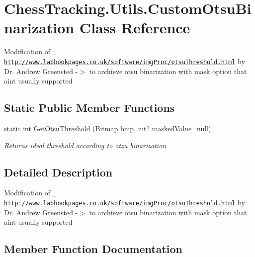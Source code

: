 \hypertarget{class_chess_tracking_1_1_utils_1_1_custom_otsu_binarization}{}\section{Chess\+Tracking.\+Utils.\+Custom\+Otsu\+Binarization Class Reference}
\label{class_chess_tracking_1_1_utils_1_1_custom_otsu_binarization}


Modification of \href{http://www.labbookpages.co.uk/software/imgProc/otsuThreshold.html}{\texttt{ http\+://www.\+labbookpages.\+co.\+uk/software/img\+Proc/otsu\+Threshold.\+html}} by Dr. Andrew Greensted -\/$>$ to archieve otsu binarization with mask option that ain\textquotesingle{}t usually supported  


\subsection*{Static Public Member Functions}
\begin{DoxyCompactItemize}
\item 
static int \mbox{\hyperlink{class_chess_tracking_1_1_utils_1_1_custom_otsu_binarization_a5d3e1412d590a1845413b0f2ae5f794c}{Get\+Otsu\+Threshold}} (Bitmap bmp, int? masked\+Value=null)
\begin{DoxyCompactList}\small\item\em Returns ideal threshold according to otzu binarization \end{DoxyCompactList}\end{DoxyCompactItemize}


\subsection{Detailed Description}
Modification of \href{http://www.labbookpages.co.uk/software/imgProc/otsuThreshold.html}{\texttt{ http\+://www.\+labbookpages.\+co.\+uk/software/img\+Proc/otsu\+Threshold.\+html}} by Dr. Andrew Greensted -\/$>$ to archieve otsu binarization with mask option that ain\textquotesingle{}t usually supported 



\subsection{Member Function Documentation}
\mbox{\label{class_chess_tracking_1_1_utils_1_1_custom_otsu_binarization_a5d3e1412d590a1845413b0f2ae5f794c}} 
